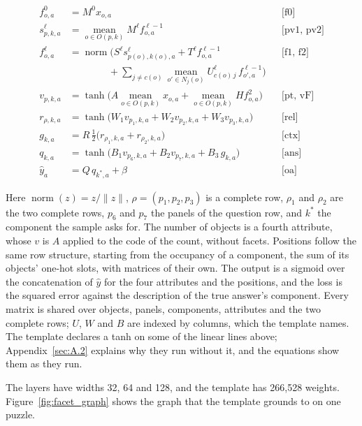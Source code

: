 \begin{align*}
f^{0}_{o,a} &= M^{0} x_{o,a} && \text{[f0]}\\
s^{\ell}_{p,k,a} &= \operatorname*{mean}_{o \in O(p,k)} M^{\ell} f^{\ell-1}_{o,a} && \text{[pv1, pv2]}\\
f^{\ell}_{o,a} &= \operatorname{norm}\Big( S^{\ell} s^{\ell}_{p(o),k(o),a} + T^{\ell} f^{\ell-1}_{o,a} && \text{[f1, f2]}\\
&\qquad\qquad + \sum_{j \ne c(o)} \operatorname*{mean}_{o' \in N_j(o)} U^{\ell}_{c(o)\,j}\, f^{\ell-1}_{o',a} \Big) \\
v_{p,k,a} &= \tanh\Big( A \operatorname*{mean}_{o \in O(p,k)} x_{o,a} + \operatorname*{mean}_{o \in O(p,k)} H f^{2}_{o,a} \Big) && \text{[pt, vF]}\\
r_{\rho,k,a} &= \tanh\big( W_1 v_{p_1,k,a} + W_2 v_{p_2,k,a} + W_3 v_{p_3,k,a} \big) && \text{[rel]}\\
g_{k,a} &= R\, \tfrac{1}{2} \big( r_{\rho_1,k,a} + r_{\rho_2,k,a} \big) && \text{[ctx]}\\
q_{k,a} &= \tanh\big( B_1 v_{p_6,k,a} + B_2 v_{p_7,k,a} + B_3\, g_{k,a} \big) && \text{[ans]}\\
\hat{y}_{a} &= Q\, q_{k^{*},a} + \beta && \text{[oa]}
\end{align*}

Here \(\operatorname{norm}(z) = z / \lVert z \rVert\), \(\rho = (p_1, p_2, p_3)\) is a complete row, \(\rho_1\) and \(\rho_2\) are the two complete rows, \(p_6\) and \(p_7\) the panels of the question row, and \(k^{*}\) the component the sample asks for. The number of objects is a fourth attribute, whose \(v\) is \(A\) applied to the code of the count, without facets. Positions follow the same row structure, starting from the occupancy of a component, the sum of its objects' one-hot slots, with matrices of their own. The output is a sigmoid over the concatenation of \(\hat{y}\) for the four attributes and the positions, and the loss is the squared error against the description of the true answer's component. Every matrix is shared over objects, panels, components, attributes and the two complete rows; \(U\), \(W\) and \(B\) are indexed by columns, which the template names. The template declares a tanh on some of the linear lines above; Appendix~\ref{sec:A.2} explains why they run without it, and the equations show them as they run.

The layers have widths 32, 64 and 128, and the template has 266,528 weights. Figure~\ref{fig:facet_graph} shows the graph that the template grounds to on one puzzle.

